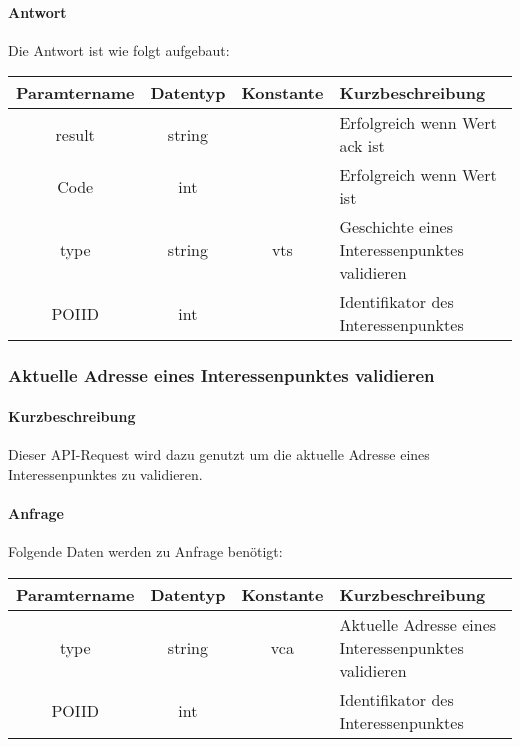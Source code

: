 \paragraph{Antwort}Die Antwort ist wie folgt aufgebaut:
\begin{table}[H]
	\begin{tabular}{|c|c|c|p{6.5cm}|}
		\hline
		\textbf{Paramtername} & \textbf{Datentyp} & \textbf{Konstante} & \textbf{Kurzbeschreibung}                                                                                               \\ \hline
		result              & string           &                 & Erfolgreich wenn Wert {\glqq ack\grqq} ist \\ \hline
		Code                & int              &                 & Erfolgreich wenn Wert {\glqq 0\grqq} ist \\ \hline
		type                & string           & vts             & Geschichte eines Interessenpunktes validieren \\ \hline
		POIID               & int              &                 & Identifikator des Interessenpunktes \\ \hline
	\end{tabular}
\end{table}
\subsubsection{Aktuelle Adresse eines Interessenpunktes validieren}
\paragraph{Kurzbeschreibung}Dieser API-Request wird dazu genutzt um die aktuelle Adresse eines Interessenpunktes zu validieren.
\paragraph{Anfrage}Folgende Daten werden zu Anfrage benötigt:
\begin{table}[H]
	\begin{tabular}{|c|c|c|p{6.5cm}|}
		\hline
		\textbf{Paramtername} & \textbf{Datentyp} & \textbf{Konstante} & \textbf{Kurzbeschreibung}                                                                                               \\ \hline
		type                & string            & vca                & Aktuelle Adresse eines Interessenpunktes validieren \\ \hline
		POIID               & int               &                    & Identifikator des Interessenpunktes \\ \hline
	\end{tabular}
\end{table}
